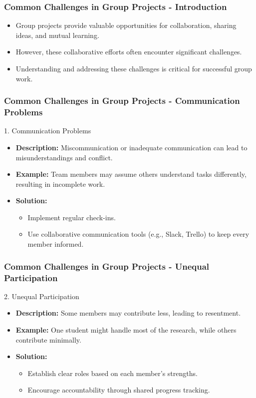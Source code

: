 \documentclass[aspectratio=169]{beamer}
\begin{document}
\begin{frame}[fragile]
  \frametitle{Common Challenges in Group Projects - Introduction}
  \begin{itemize}
    \item Group projects provide valuable opportunities for collaboration, sharing ideas, and mutual learning.
    \item However, these collaborative efforts often encounter significant challenges.
    \item Understanding and addressing these challenges is critical for successful group work.
  \end{itemize}
\end{frame}

\begin{frame}[fragile]
  \frametitle{Common Challenges in Group Projects - Communication Problems}
  \begin{block}{1. Communication Problems}
    \begin{itemize}
      \item \textbf{Description:} Miscommunication or inadequate communication can lead to misunderstandings and conflict.
      \item \textbf{Example:} Team members may assume others understand tasks differently, resulting in incomplete work.
      \item \textbf{Solution:} 
        \begin{itemize}
          \item Implement regular check-ins.
          \item Use collaborative communication tools (e.g., Slack, Trello) to keep every member informed.
        \end{itemize}
    \end{itemize}
  \end{block}
\end{frame}

\begin{frame}[fragile]
  \frametitle{Common Challenges in Group Projects - Unequal Participation}
  \begin{block}{2. Unequal Participation}
    \begin{itemize}
      \item \textbf{Description:} Some members may contribute less, leading to resentment.
      \item \textbf{Example:} One student might handle most of the research, while others contribute minimally.
      \item \textbf{Solution:} 
        \begin{itemize}
          \item Establish clear roles based on each member's strengths.
          \item Encourage accountability through shared progress tracking.
        \end{itemize}
    \end{itemize}
  \end{block}
\end{frame}
\end{document}
